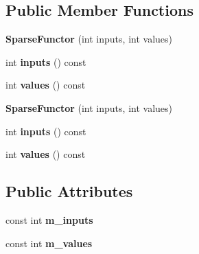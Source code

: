 \subsection*{Public Member Functions}
\begin{DoxyCompactItemize}
\item 
\mbox{\label{struct_eigen_1_1_sparse_functor_a1c9e38d9692ebfdb9145a801a4d1a0ec}} 
{\bfseries Sparse\+Functor} (int inputs, int values)
\item 
\mbox{\label{struct_eigen_1_1_sparse_functor_a712ff4e83e1403777c6863200e793ab8}} 
int {\bfseries inputs} () const
\item 
\mbox{\label{struct_eigen_1_1_sparse_functor_a91b9ff3608d8f4fbca1a1df004582851}} 
int {\bfseries values} () const
\item 
\mbox{\label{struct_eigen_1_1_sparse_functor_a1c9e38d9692ebfdb9145a801a4d1a0ec}} 
{\bfseries Sparse\+Functor} (int inputs, int values)
\item 
\mbox{\label{struct_eigen_1_1_sparse_functor_a712ff4e83e1403777c6863200e793ab8}} 
int {\bfseries inputs} () const
\item 
\mbox{\label{struct_eigen_1_1_sparse_functor_a91b9ff3608d8f4fbca1a1df004582851}} 
int {\bfseries values} () const
\end{DoxyCompactItemize}
\subsection*{Public Attributes}
\begin{DoxyCompactItemize}
\item 
\mbox{\label{struct_eigen_1_1_sparse_functor_a64fdb81f92ba3fdc01c32e57cbf4bd31}} 
const int {\bfseries m\+\_\+inputs}
\item 
\mbox{\label{struct_eigen_1_1_sparse_functor_aa1b65a0291e779316828ee72affd05cd}} 
const int {\bfseries m\+\_\+values}
\end{DoxyCompactItemize}


